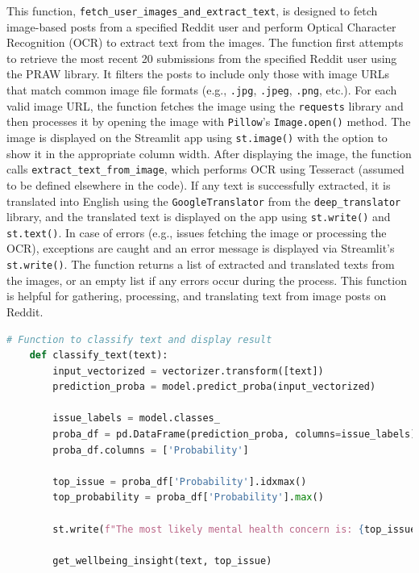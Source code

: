 \noindent
This function, \texttt{fetch\_user\_images\_and\_extract\_text}, is designed to fetch image-based posts from a specified Reddit user and perform Optical Character Recognition (OCR) to extract text from the images. The function first attempts to retrieve the most recent 20 submissions from the specified Reddit user using the PRAW library. It filters the posts to include only those with image URLs that match common image file formats (e.g., \texttt{.jpg}, \texttt{.jpeg}, \texttt{.png}, etc.). For each valid image URL, the function fetches the image using the \texttt{requests} library and then processes it by opening the image with \texttt{Pillow}’s \texttt{Image.open()} method. The image is displayed on the Streamlit app using \texttt{st.image()} with the option to show it in the appropriate column width. After displaying the image, the function calls \texttt{extract\_text\_from\_image}, which performs OCR using Tesseract (assumed to be defined elsewhere in the code). If any text is successfully extracted, it is translated into English using the \texttt{GoogleTranslator} from the \texttt{deep\_translator} library, and the translated text is displayed on the app using \texttt{st.write()} and \texttt{st.text()}. In case of errors (e.g., issues fetching the image or processing the OCR), exceptions are caught and an error message is displayed via Streamlit’s \texttt{st.write()}. The function returns a list of extracted and translated texts from the images, or an empty list if any errors occur during the process. This function is helpful for gathering, processing, and translating text from image posts on Reddit.


\begin{tcolorbox}[colback=gray!5!white, colframe=gray!80!black, boxrule=0.5pt, title=Classifying Text and Displaying Results]
    \begin{lstlisting}[language=Python]
    # Function to classify text and display result
    def classify_text(text):
        input_vectorized = vectorizer.transform([text])
        prediction_proba = model.predict_proba(input_vectorized)

        issue_labels = model.classes_
        proba_df = pd.DataFrame(prediction_proba, columns=issue_labels).T
        proba_df.columns = ['Probability']

        top_issue = proba_df['Probability'].idxmax()
        top_probability = proba_df['Probability'].max()

        st.write(f"The most likely mental health concern is: {top_issue} with a probability of {top_probability:.2%}")

        get_wellbeing_insight(text, top_issue)
    \end{lstlisting}
\end{tcolorbox}

